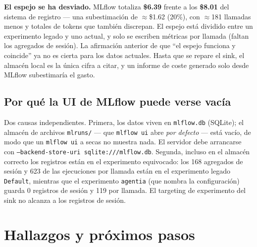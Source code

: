 \documentclass[11pt,a4paper]{article}
\begin{document}
\begin{notebox}[colframe=warn]
\textbf{El espejo se ha desviado.} MLflow totaliza \textbf{\$6.39} frente a los
\textbf{\$8.01} del sistema de registro --- una subestimación de $\approx$\$1.62
(20\%), con $\approx$181 llamadas menos y totales de tokens que también discrepan. El
espejo está dividido entre un experimento legado y uno actual, y solo se escriben
métricas por llamada (faltan los agregados de sesión). La afirmación anterior de que
``el espejo funciona y coincide'' ya no es cierta para los datos actuales. Hasta que
se repare el sink, el almacén local es la única cifra a citar, y un informe de coste
generado solo desde MLflow subestimaría el gasto.
\end{notebox}

\subsection{Por qué la UI de MLflow puede verse vacía}

Dos causas independientes. Primera, los datos viven en \texttt{mlflow.db} (SQLite); el
almacén de archivos \texttt{mlruns/} --- que \texttt{mlflow ui} abre \emph{por
defecto} --- está vacío, de modo que un \texttt{mlflow ui} a secas no muestra nada. El
servidor debe arrancarse con \texttt{--backend-store-uri sqlite:///mlflow.db}. Segunda,
incluso en el almacén correcto los registros están en el experimento equivocado: los
168 agregados de sesión y 623 de las ejecuciones por llamada están en el experimento
legado \texttt{Default}, mientras que el experimento \texttt{agentia} (que nombra la
configuración) guarda 0 registros de sesión y 119 por llamada. El targeting de
experimento del sink no alcanza a los registros de sesión.

\section{Hallazgos y próximos pasos}
\label{sec:findings}
\end{document}
